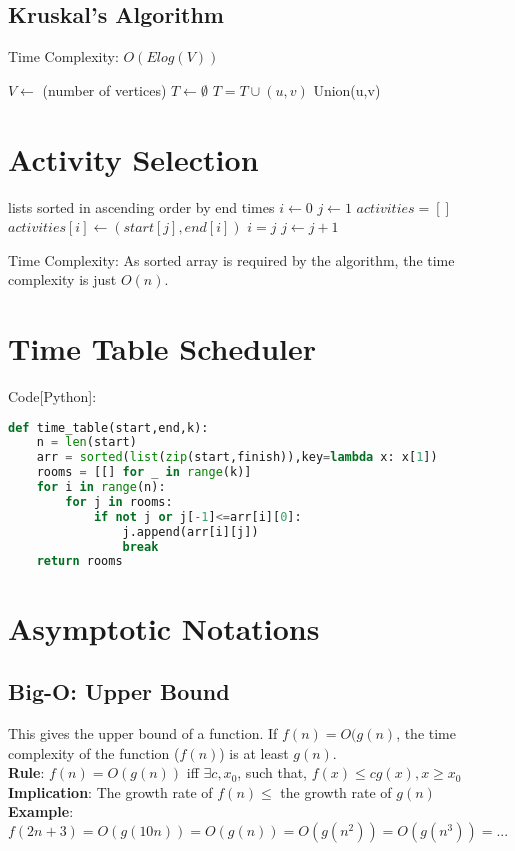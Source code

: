 \documentclass{article}
\begin{document}
\subsection{Kruskal's Algorithm}
Time Complexity: $O(E log(V))$
\begin{algorithm}
\begin{algorithmic}
\STATE $ V \leftarrow$ (number of vertices)
\STATE $ T \leftarrow \emptyset $
\STATE $T = T \cup (u,v)$
\STATE Union(u,v)
\ENDIF
\ENDFOR
\end{algorithmic}
\end{algorithm}


\section{Activity Selection}
\begin{algorithm}
\begin{algorithmic} 
\REQUIRE lists sorted in ascending order by end times
\STATE $i \leftarrow 0$
\STATE $j \leftarrow 1$
\STATE $activities = []$
\STATE $activities[i] \leftarrow (start[j],end[i])$
\STATE $i = j$
\ENDIF
\STATE $j \leftarrow j+1$
\ENDWHILE
\end{algorithmic}
\end{algorithm}
Time Complexity: As sorted array is required by the algorithm, the time complexity is just $O(n)$.


\section{Time Table Scheduler}
Code[Python]:
\begin{lstlisting}[language=python]
def time_table(start,end,k):
    n = len(start)
    arr = sorted(list(zip(start,finish)),key=lambda x: x[1])
    rooms = [[] for _ in range(k)]
    for i in range(n):
        for j in rooms:
            if not j or j[-1]<=arr[i][0]:
                j.append(arr[i][j])
                break
    return rooms
\end{lstlisting}


\section{Asymptotic Notations}

\subsection{Big-O: Upper Bound}
This gives the upper bound of a function. If $f(n) = O(g(n)$, the time complexity of the function ($f(n)$) is at least $g(n)$.\\
\textbf{Rule}: $f(n) = O(g(n))$ iff $\exists c, x_0$, such that, $f(x) \leq c g(x), x \geq x_0$\\
\textbf{Implication}: The growth rate of $f(n) \leq$ the growth rate of $g(n)$\\
\textbf{Example}: $f(2n+3) = O(g(10n)) = O(g(n)) = O(g(n^2)) = O(g(n^3)) = ...$
\end{document}
